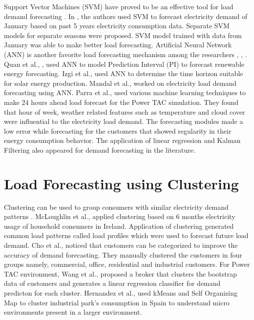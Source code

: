 Support Vector Machines (SVM) have proved to be an effective tool for load demand forecasting \cite{sapankevych2009time, chen2004load}. In \cite{chen2004load}, the authors used SVM to forecast electricity demand of January based on past 5 years electricity consumption data. Separate SVM models for separate seasons were proposed. SVM model trained with data from January was able to make better load forecasting. Artificial Neural Network (ANN) is another favorite load forecasting mechanism among the researchers \cite{izgi2012short}, \cite{quan2014short}, \cite{hsu2003regional}. Quan et al., \cite{quan2014short}, used ANN to model Prediction Interval (PI) to forecast renewable energy forecasting. Izgi et al.,  \cite{izgi2012short} used ANN to determine the time horizon suitable for solar energy production. Mandal et al., \cite{mandal2006neural} worked on electricity load demand forecasting using ANN. Parra \cite{parra2013initial} et al., used various machine learning techniques to make 24 hours ahead load forecast for the Power TAC simulation. They found that hour of week, weather related features such as temperature and cloud cover were influential to the electricity load demand. The forecasting modules made a low error while forecasting for the customers that showed regularity in their energy consumption behavior. The application of linear regression \cite{mcloughlin2015clustering, hernandez2012classification} and Kalman Filtering \cite{al2004short} also appeared for demand forecasting in the literature. 

\section {Load Forecasting using Clustering}

Clustering can be used to group consumers with similar electricity demand patterns \cite{hernandez2012classification}. McLoughlin et al., \cite{mcloughlin2015clustering} applied clustering based on 6 months electricity usage of household consumers in Ireland. Application of clustering generated common load patterns called load profiles which were used to forecast future load demand. Cho \cite{cho1995customer} et al., noticed that customers can be categorized to improve the accuracy of demand forecasting. They manually clustered the customers in four groups namely, commercial, office, residential and industrial customers. For Power TAC environment, Wang et al., \cite{wang2015gongbroker} proposed a broker that clusters the bootstrap data of customers and generates a linear regression classifier for demand predicton for each cluster.  Hernandez et al., \cite{hernandez2012classification} used kMeans and Self Organizing Map to cluster industrial park's consumption in Spain to understand micro environments present in a larger environment.


